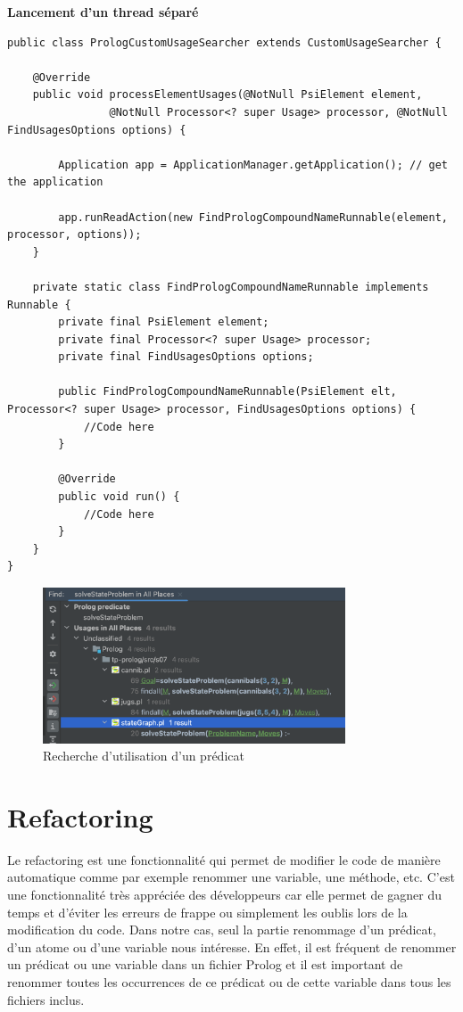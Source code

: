 \noindent \textbf{Lancement d'un thread séparé}
\begin{lstlisting}[label={lst:method_find_usages}, caption={Lancement d'un thread séparé}]
public class PrologCustomUsageSearcher extends CustomUsageSearcher {

    @Override
    public void processElementUsages(@NotNull PsiElement element,
                @NotNull Processor<? super Usage> processor, @NotNull FindUsagesOptions options) {

        Application app = ApplicationManager.getApplication(); // get the application

        app.runReadAction(new FindPrologCompoundNameRunnable(element, processor, options));
    }

    private static class FindPrologCompoundNameRunnable implements Runnable {
        private final PsiElement element;
        private final Processor<? super Usage> processor;
        private final FindUsagesOptions options;

        public FindPrologCompoundNameRunnable(PsiElement elt, Processor<? super Usage> processor, FindUsagesOptions options) {
            //Code here
        }

        @Override
        public void run() {
            //Code here
        }
    }
}
\end{lstlisting}

\begin{figure}[H]
    \centering
    \includegraphics[width=0.8\textwidth]{images/Find_Usage.png}
    \caption{Recherche d'utilisation d'un prédicat}
    \label{fig:usage}
\end{figure}


\section{Refactoring}
\noindent Le refactoring est une fonctionnalité qui permet de modifier le code de manière automatique comme par exemple renommer une variable, une méthode, etc.
C'est une fonctionnalité très appréciée des développeurs car elle permet de gagner du temps et d'éviter les erreurs de frappe ou simplement les oublis lors de la modification du code.
\newdoubleline
Dans notre cas, seul la partie renommage d'un prédicat, d'un atome ou d'une variable nous intéresse.
En effet, il est fréquent de renommer un prédicat ou une variable dans un fichier Prolog et il est important de renommer
toutes les occurrences de ce prédicat ou de cette variable dans tous les fichiers inclus.

